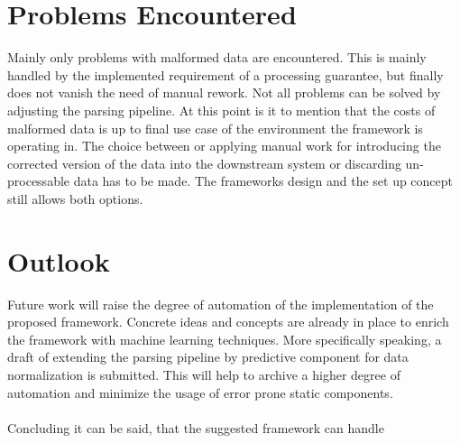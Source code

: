 \section{Problems Encountered\label{sec:problems}}

Mainly only problems with malformed data are encountered. This is mainly handled by the implemented requirement of a processing guarantee, but finally does not vanish the need of manual rework. Not all problems can be solved by adjusting the parsing pipeline. At this point is it to mention that the costs of malformed data is up to final use case of the environment the framework is operating in. The choice between or applying manual work for introducing the corrected version of the data into the downstream system or discarding un-processable data has to be made. The frameworks design and the set up concept still allows both options. 

\section{Outlook\label{sec:outlook}}

Future work will raise the degree of automation of the implementation of the proposed framework. Concrete ideas and concepts are already in place to enrich the framework with machine learning techniques. More specifically speaking, a draft of extending the parsing pipeline by predictive component for data normalization is submitted. This will help to archive a higher degree of automation and minimize the usage of error prone static components.
\\\\

Concluding it can be said, that the suggested framework can handle 
